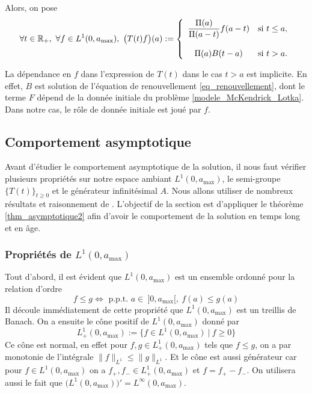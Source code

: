Alors, on pose 
\begin{equation}\label{solution_SM}
    \forall t \in \bbR_+, \ \forall f \in L^1(0,a_{\max}), \ \big(T(t)f\big)(a) := \left\{\begin{array}{cl}
        \dfrac{\Pi(a)}{\Pi(a-t)}f(a-t) & \text{si } t \leq a, \\
        & \\
        \Pi(a)B(t-a) & \text{si } t > a.
    \end{array}\right.
\end{equation}

\begin{remark}
    La dépendance en $f$ dans l'expression de $T(t)$ dans le cas $t>a$ est implicite. En effet, $B$ est solution de l'équation de renouvellement \eqref{eq_renouvellement}, dont le terme $F$ dépend de la donnée initiale du problème \eqref{modele_McKendrick_Lotka}. Dans notre cas, le rôle de \og donnée initiale \fg{} est joué par $f$.
\end{remark}

\subsection{Comportement asymptotique}
Avant d'étudier le comportement asymptotique de la solution, il nous faut vérifier plusieurs propriétés sur notre espace ambiant $L^1(0,a_{\max})$, le semi-groupe $\big\{T(t)\big\}_{t \geq 0}$ et le générateur infinitésimal $A$. Nous allons utiliser de nombreux résultats et raisonnement de \cite{Clement1987,Engel1991}. L'objectif de la section est d'appliquer le théorème \ref{thm_asymptotique2} afin d'avoir le comportement de la solution en temps long et en âge.

\subsubsection{Propriétés de \texorpdfstring{$L^1(0,a_{\max})$}{L1(0,amax)}}
Tout d'abord, il est évident que $L^1(0,a_{\max})$ est un ensemble ordonné pour la relation d'ordre 
\begin{equation*}
    f \leq g \iff \text{ p.p.t. } a \in \ ]0,a_{\max}[, \ f(a) \leq g(a)
\end{equation*}
Il découle immédiatement de cette propriété que $L^1(0,a_{\max})$ est un treillis de Banach. On a ensuite le cône positif de $L^1(0,a_{\max})$ donné par 
\begin{equation*}
    L^1_+(0,a_{\max}) := \big\{ f \in L^1(0,a_{\max}) \ | \  f \geq 0\big\}
\end{equation*}
Ce cône est normal, en effet pour $f,g \in L^1_+(0,a_{\max})$ tels que $f \leq g$, on a par monotonie de l'intégrale $\|f\|_{L^1} \leq \|g\|_{L^1}$. Et le cône est aussi générateur car pour $f \in L^1(0,a_{\max})$ on a $f_+,f_- \in L^1_+(0,a_{\max})$ et $f=f_+-f_-$. On utilisera aussi le fait que $\big(L^1(0,a_{\max})\big)' = L^\infty(0,a_{\max})$.

